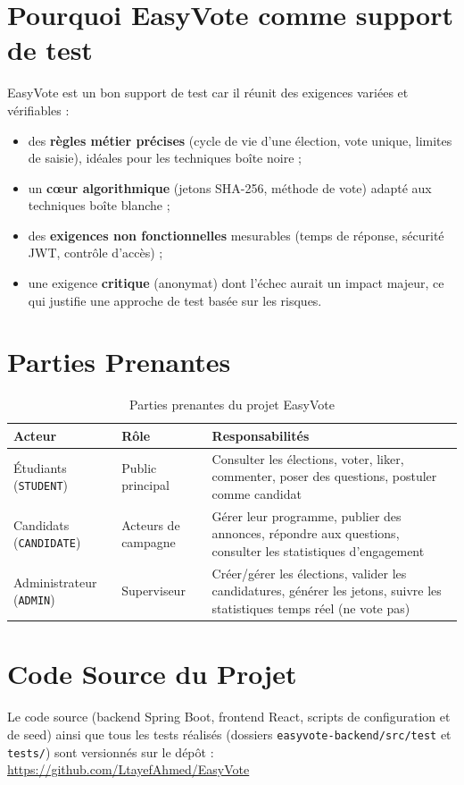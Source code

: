 \documentclass[12pt,a4paper]{report}
\begin{document}
\section{Pourquoi EasyVote comme support de test}
EasyVote est un bon support de test car il réunit des exigences variées et vérifiables :
\begin{itemize}
  \item des \textbf{règles métier précises} (cycle de vie d'une élection, vote unique, limites de saisie), idéales pour les techniques boîte noire ;
  \item un \textbf{cœur algorithmique} (jetons SHA-256, méthode de vote) adapté aux techniques boîte blanche ;
  \item des \textbf{exigences non fonctionnelles} mesurables (temps de réponse, sécurité JWT, contrôle d'accès) ;
  \item une exigence \textbf{critique} (anonymat) dont l'échec aurait un impact majeur, ce qui justifie une approche de test basée sur les risques.
\end{itemize}

\section{Parties Prenantes}
\begin{table}[H]
\centering
\caption{Parties prenantes du projet EasyVote}
\small
\begin{tabularx}{\textwidth}{@{}p{3cm}p{3.2cm}X@{}}
\toprule
\rowcolor{evlight}\textbf{Acteur} & \textbf{Rôle} & \textbf{Responsabilités}\\
\midrule
Étudiants (\texttt{STUDENT}) & Public principal & Consulter les élections, voter, liker, commenter, poser des questions, postuler comme candidat\\
Candidats (\texttt{CANDIDATE}) & Acteurs de campagne & Gérer leur programme, publier des annonces, répondre aux questions, consulter les statistiques d'engagement\\
Administrateur (\texttt{ADMIN}) & Superviseur & Créer/gérer les élections, valider les candidatures, générer les jetons, suivre les statistiques temps réel (ne vote pas)\\
\bottomrule
\end{tabularx}
\end{table}

\section{Code Source du Projet}
Le code source (backend Spring Boot, frontend React, scripts de configuration et de seed) ainsi que tous les tests réalisés (dossiers \texttt{easyvote-backend/src/test} et \texttt{tests/}) sont versionnés sur le dépôt :
\url{https://github.com/LtayefAhmed/EasyVote}
\end{document}
